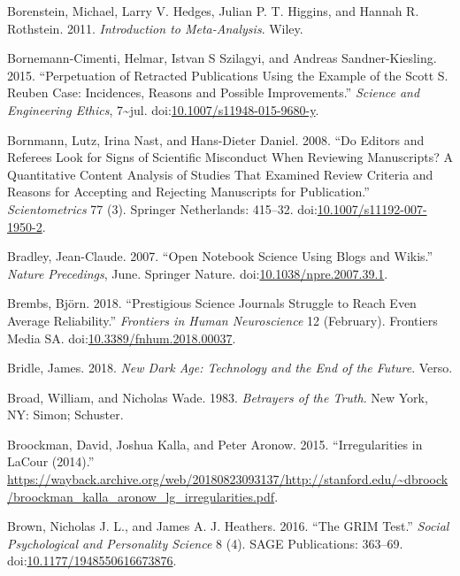 \documentclass[a5paper]{book}
\begin{document}
\hypertarget{ref-isbn:9781119964377}{}
Borenstein, Michael, Larry V. Hedges, Julian P. T. Higgins, and Hannah
R. Rothstein. 2011. \emph{Introduction to Meta-Analysis}. Wiley.

\hypertarget{ref-doi:10.1007ux2fs11948-015-9680-y}{}
Bornemann-Cimenti, Helmar, Istvan S Szilagyi, and Andreas
Sandner-Kiesling. 2015. ``Perpetuation of Retracted Publications Using
the Example of the Scott S. Reuben Case: Incidences, Reasons and
Possible Improvements.'' \emph{Science and Engineering Ethics},
7\textasciitilde{}jul.
doi:\href{https://doi.org/10.1007/s11948-015-9680-y}{10.1007/s11948-015-9680-y}.

\hypertarget{ref-doi:10.1007ux2fs11192-007-1950-2}{}
Bornmann, Lutz, Irina Nast, and Hans-Dieter Daniel. 2008. ``Do Editors
and Referees Look for Signs of Scientific Misconduct When Reviewing
Manuscripts? A Quantitative Content Analysis of Studies That Examined
Review Criteria and Reasons for Accepting and Rejecting Manuscripts for
Publication.'' \emph{Scientometrics} 77 (3). Springer Netherlands:
415--32.
doi:\href{https://doi.org/10.1007/s11192-007-1950-2}{10.1007/s11192-007-1950-2}.

\hypertarget{ref-doi:10.1038ux2fnpre.2007.39.1}{}
Bradley, Jean-Claude. 2007. ``Open Notebook Science Using Blogs and
Wikis.'' \emph{Nature Precedings}, June. Springer Nature.
doi:\href{https://doi.org/10.1038/npre.2007.39.1}{10.1038/npre.2007.39.1}.

\hypertarget{ref-doi:10.3389ux2ffnhum.2018.00037}{}
Brembs, Björn. 2018. ``Prestigious Science Journals Struggle to Reach
Even Average Reliability.'' \emph{Frontiers in Human Neuroscience} 12
(February). Frontiers Media SA.
doi:\href{https://doi.org/10.3389/fnhum.2018.00037}{10.3389/fnhum.2018.00037}.

\hypertarget{ref-isbn:9781786635471}{}
Bridle, James. 2018. \emph{New Dark Age: Technology and the End of the
Future}. Verso.

\hypertarget{ref-isbn:9780671447694}{}
Broad, William, and Nicholas Wade. 1983. \emph{Betrayers of the Truth}.
New York, NY: Simon; Schuster.

\hypertarget{ref-lg-irreg}{}
Broockman, David, Joshua Kalla, and Peter Aronow. 2015. ``Irregularities
in LaCour (2014).''
\url{https://wayback.archive.org/web/20180823093137/http://stanford.edu/~dbroock/broockman_kalla_aronow_lg_irregularities.pdf}.

\hypertarget{ref-doi:10.1177ux2f1948550616673876}{}
Brown, Nicholas J. L., and James A. J. Heathers. 2016. ``The GRIM
Test.'' \emph{Social Psychological and Personality Science} 8 (4). SAGE
Publications: 363--69.
doi:\href{https://doi.org/10.1177/1948550616673876}{10.1177/1948550616673876}.
\end{document}
